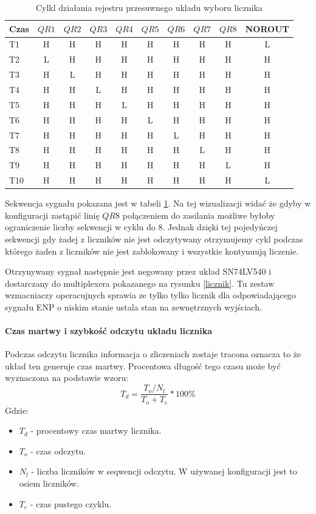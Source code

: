 \documentclass[a4paper,12pt]{article}
\begin{document}
\begin{table}
        \centering
        \caption{Cylkl działania rejestru przesuwnego ukladu wyboru licznika}
        \label{shift sygnal}
        \begin{tabular}{lccccccccc}
                Czas &$QR1$&$QR2$&$QR3$&$QR4$&$QR5$&$QR6$&$QR7$&$QR8$  &NOROUT\\ \hline     
                T1&H&H&H&H&H&H&H&H &L\\
                T2&L&H&H&H&H&H&H&H &H\\
                T3&H&L&H&H&H&H&H&H &H\\
                T4&H&H&L&H&H&H&H&H &H\\
                T5&H&H&H&L&H&H&H&H &H\\
                T6&H&H&H&H&L&H&H&H &H\\
                T7&H&H&H&H&H&L&H&H &H\\
                T8&H&H&H&H&H&H&L&H &H\\
                T9&H&H&H&H&H&H&H&L &H\\
                T10&H&H&H&H&H&H&H&H &L\\
        \end{tabular}
\end{table}

Sekwencja sygnału pokazana jest w tabeli \ref{shift sygnal}. Na tej wizualizacji widać że gdyby w konfiguracji zastąpić linię $QR8$ połączeniem do zasilania możliwe byłoby ograniczenie liczby sekwencji w cyklu do 8. Jednak dzięki tej pojedyńczej sekwencji gdy żadej z liczników nie jest odczytywany otrzymujemy cykl podczas którego żaden z liczników nie jest zablokowany i wszystkie kontynuują liczenie. 

Otrzynywany sygnał następnie jest negowany przez układ SN74LV540 i dostarczany do multiplexera pokazanego na rysunku \ref{licznik}.
Tu zestaw wzmacniaczy operacujnych sprawia ze tylko tylko licznik dla odpowiadającego sygnału ENP o niskim stanie ustala stan na zewnętrznych wyjściach. 

\paragraph{Czas martwy i szybkość odczytu układu licznika}
Podczas odczytu licznika informacja o zliczeniach zostaje tracona oznacza to że układ ten generuje czas martwy. 
Procentowa długość tego czasu może być wyznaczona na podstawie wzoru:
\begin{equation}
        T_d = \frac{T_o/N_l}{T_o+T_e} * 100\%
\end{equation}
Gdzie:
\begin{itemize}
        \item $T_d$ - procentowy czas martwy licznika.
        \item $T_o$ - czas odczytu.
        \item $N_l$ - liczba liczników w seqwencji odczytu. W używanej konfiguracji jest to osiem liczników. 
        \item $T_e$ - czas pustego czyklu.
\end{itemize}
\end{document}
